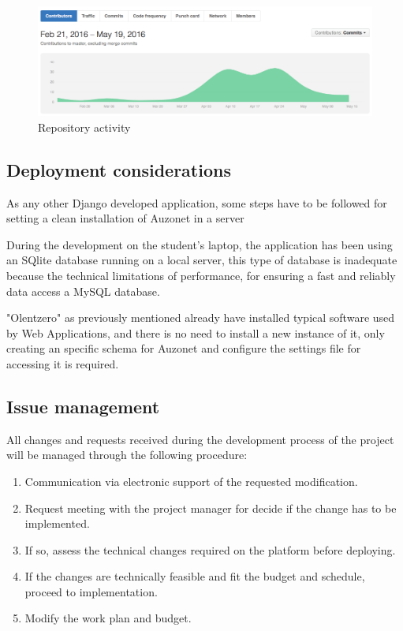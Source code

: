 \documentclass{DeustoFDP}
\begin{document}
\begin{figure}[h!]
\centering
\includegraphics[width=0.7\linewidth]{fig/githubactivity}
\caption[Repository activity]{Repository activity}
\label{fig:githubactivity}
\end{figure}

\subsection{Deployment considerations}
As any other Django developed application, some steps have to be followed for setting a clean installation of Auzonet in a server

During the development on the student's laptop, the application has been using an SQlite database running on a local server, this type of database is inadequate because the technical limitations of performance, for ensuring a fast and reliably data access a MySQL database. 

"Olentzero" as previously mentioned already have installed typical software used by Web Applications, and there is no need to install a new instance of it, only creating an specific schema for Auzonet and configure the settings file for accessing it is required. 

\subsection{Issue management}
All changes and requests received during the development process of the project will be managed through the following procedure:
\begin{enumerate}
	\item Communication via electronic support of the requested modification.
	\item Request meeting with the project manager for decide if the change has to be implemented.
	\item If so, assess the technical changes required on the platform before deploying.
	\item If the changes are technically feasible and fit the budget and schedule, proceed to implementation.
	\item Modify the work plan and budget.
\end{enumerate}
\end{document}
